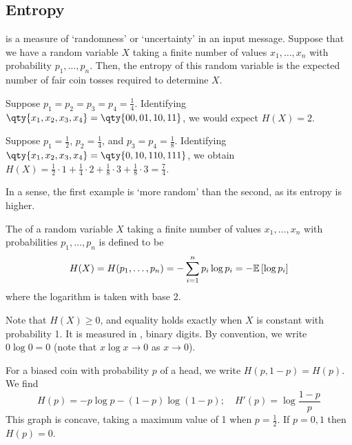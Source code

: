 \subsection{Entropy}
 is a measure of `randomness' or `uncertainty' in an input message.
Suppose that we have a random variable $X$ taking a finite number of values $x_1, \dots, x_n$ with probability $p_1, \dots, p_n$.
Then, the entropy of this random variable is the expected number of fair coin tosses required to determine $X$.
\begin{example}
    Suppose $p_1 = p_2 = p_3 = p_4 = \frac{1}{4}$.
    Identifying $\qty{x_1, x_2, x_3, x_4} = \qty{00, 01, 10, 11}$, we would expect $H(X) = 2$.
\end{example}
\begin{example}
    Suppose $p_1 = \frac{1}{2}$, $p_2 = \frac{1}{4}$, and $p_3 = p_4 = \frac{1}{8}$.
    Identifying $\qty{x_1, x_2, x_3, x_4} = \qty{0, 10, 110, 111}$, we obtain $H(X) = \frac{1}{2} \cdot 1 + \frac{1}{4} \cdot 2 + \frac{1}{8} \cdot 3 + \frac{1}{8} \cdot 3 = \frac{7}{4}$.
\end{example}
In a sense, the first example is `more random' than the second, as its entropy is higher.
\begin{definition}
    The  of a random variable $X$ taking a finite number of values $x_1, \dots, x_n$ with probabilities $p_1, \dots, p_n$ is defined to be
    \[ H(X) = H(p_1, \dots, p_n) = -\sum_{i=1}^n p_i \log p_i = -\mathbb{E}\left[{\log p_i}\right] \]
    where the logarithm is taken with base 2.
\end{definition}
Note that $H(X) \geq 0$, and equality holds exactly when $X$ is constant with probability 1.
It is measured in , binary digits.
By convention, we write $0 \log 0 = 0$ (note that $x \log x \to 0$ as $x \to 0$).
\begin{example}
    For a biased coin with probability $p$ of a head, we write $H(p,1-p) = H(p)$.
    We find
    \[ H(p) = -p\log p - (1-p)\log(1-p);\quad H'(p) = \log \frac{1-p}{p} \]
    This graph is concave, taking a maximum value of 1 when $p = \frac{1}{2}$.
    If $p = 0, 1$ then $H(p) = 0$.
\end{example}

